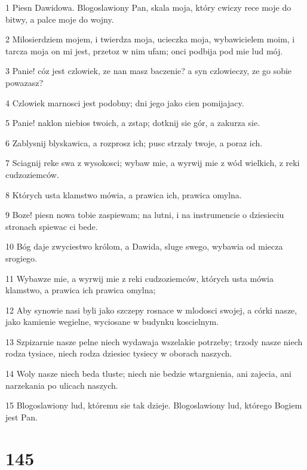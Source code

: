 \par 1 Piesn Dawidowa. Blogoslawiony Pan, skala moja, który cwiczy rece moje do bitwy, a palce moje do wojny.
\par 2 Milosierdziem mojem, i twierdza moja, ucieczka moja, wybawicielem moim, i tarcza moja on mi jest, przetoz w nim ufam; onci podbija pod mie lud mój.
\par 3 Panie! cóz jest czlowiek, ze nan masz baczenie? a syn czlowieczy, ze go sobie powazasz?
\par 4 Czlowiek marnosci jest podobny; dni jego jako cien pomijajacy.
\par 5 Panie! naklon niebios twoich, a zstap; dotknij sie gór, a zakurza sie.
\par 6 Zablysnij blyskawica, a rozprosz ich; pusc strzaly twoje, a poraz ich.
\par 7 Sciagnij reke swa z wysokosci; wybaw mie, a wyrwij mie z wód wielkich, z reki cudzoziemców.
\par 8 Których usta klamstwo mówia, a prawica ich, prawica omylna.
\par 9 Boze! piesn nowa tobie zaspiewam; na lutni, i na instrumencie o dziesieciu stronach spiewac ci bede.
\par 10 Bóg daje zwyciestwo królom, a Dawida, sluge swego, wybawia od miecza srogiego.
\par 11 Wybawze mie, a wyrwij mie z reki cudzoziemców, których usta mówia klamstwo, a prawica ich prawica omylna;
\par 12 Aby synowie nasi byli jako szczepy rosnace w mlodosci swojej, a córki nasze, jako kamienie wegielne, wyciosane w budynku koscielnym.
\par 13 Szpizarnie nasze pelne niech wydawaja wszelakie potrzeby; trzody nasze niech rodza tysiace, niech rodza dziesiec tysiecy w oborach naszych.
\par 14 Woly nasze niech beda tluste; niech nie bedzie wtargnienia, ani zajecia, ani narzekania po ulicach naszych.
\par 15 Blogoslawiony lud, któremu sie tak dzieje. Blogoslawiony lud, którego Bogiem jest Pan.

\chapter{145}

